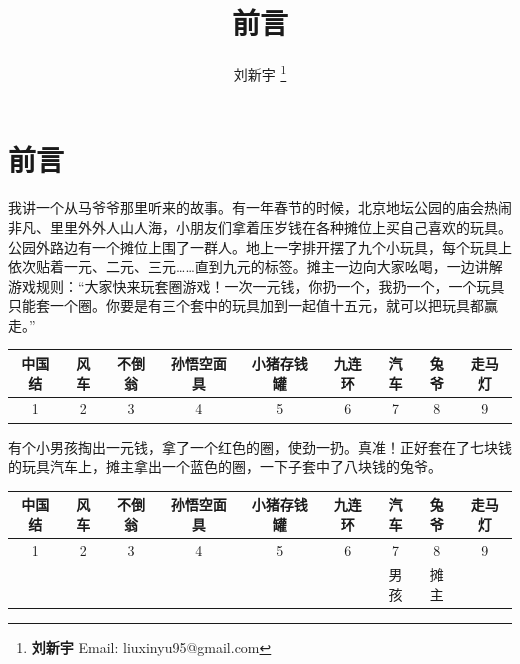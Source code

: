 \documentclass[UTF8]{article}
\begin{document}
\title{前言}

\author{刘新宇
\thanks{{\bfseries 刘新宇} \newline
  Email: liuxinyu95@gmail.com \newline}
  }

\maketitle
\fi


\chapter*{前言}

我讲一个从马爷爷那里听来的故事。有一年春节的时候，北京地坛公园的庙会热闹非凡、里里外外人山人海，小朋友们拿着压岁钱在各种摊位上买自己喜欢的玩具。公园外路边有一个摊位上围了一群人。地上一字排开摆了九个小玩具，每个玩具上依次贴着一元、二元、三元……直到九元的标签。摊主一边向大家吆喝，一边讲解游戏规则：“大家快来玩套圈游戏！一次一元钱，你扔一个，我扔一个，一个玩具只能套一个圈。你要是有三个套中的玩具加到一起值十五元，就可以把玩具都赢走。”

\vspace{5mm}
\begin{tabular}{|c|c|c|c|c|c|c|c|c|}
\hline
中国结 & 风车 & 不倒翁 & 孙悟空面具 & 小猪存钱罐 & 九连环 & 汽车 & 兔爷 & 走马灯 \\
\hline
1 & 2 & 3 & 4 & 5 & 6 & 7 & 8 & 9 \\
\hline
\end{tabular}
\vspace{5mm}

有个小男孩掏出一元钱，拿了一个红色的圈，使劲一扔。真准！正好套在了七块钱的玩具汽车上，摊主拿出一个蓝色的圈，一下子套中了八块钱的兔爷。

\vspace{5mm}
\begin{tabular}{|c|c|c|c|c|c|c|c|c|}
\hline
中国结 & 风车 & 不倒翁 & 孙悟空面具 & 小猪存钱罐 & 九连环 & 汽车 & 兔爷 & 走马灯 \\
\hline
1 & 2 & 3 & 4 & 5 & 6 & 7 & 8 & 9 \\
\hline
  &   &   &   &   &   & 男孩 & 摊主 & \\
\hline
\end{tabular}
\vspace{5mm}
\end{document}
